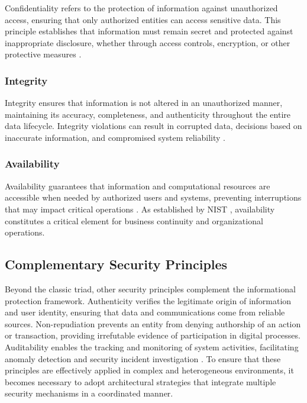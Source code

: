 \documentclass[twoside,brazilian,english]{UNISINOSmonografia}
\begin{document}
Confidentiality refers to the protection of information against unauthorized access, ensuring that only authorized entities can access sensitive data. This principle establishes that information must remain secret and protected against inappropriate disclosure, whether through access controls, encryption, or other protective measures \cite{NIST2017, Stallings2018}.

\subsubsection{Integrity}

Integrity ensures that information is not altered in an unauthorized manner, maintaining its accuracy, completeness, and authenticity throughout the entire data lifecycle. Integrity violations can result in corrupted data, decisions based on inaccurate information, and compromised system reliability \cite{Stallings2018}.

\subsubsection{Availability}

Availability guarantees that information and computational resources are accessible when needed by authorized users and systems, preventing interruptions that may impact critical operations \cite{Stallings2018}. As established by NIST \cite{NIST2017}, availability constitutes a critical element for business continuity and organizational operations.

\subsection{Complementary Security Principles}

Beyond the classic triad, other security principles complement the informational protection framework. Authenticity verifies the legitimate origin of information and user identity, ensuring that data and communications come from reliable sources. Non-repudiation prevents an entity from denying authorship of an action or transaction, providing irrefutable evidence of participation in digital processes. Auditability enables the tracking and monitoring of system activities, facilitating anomaly detection and security incident investigation \cite{Pfleeger2015, Stallings2018}. To ensure that these principles are effectively applied in complex and heterogeneous environments, it becomes necessary to adopt architectural strategies that integrate multiple security mechanisms in a coordinated manner.
\end{document}
